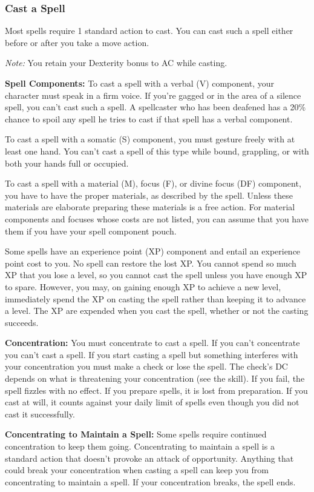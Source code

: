 \subsubsection{Cast a Spell}
Most spells require 1 standard action to cast. You can cast such a spell either before or after you take a move action.

\textit{Note:} You retain your Dexterity bonus to AC while casting.

\textbf{Spell Components:} To cast a spell with a verbal (V) component, your character must speak in a firm voice. If you're gagged or in the area of a silence spell, you can't cast such a spell. A spellcaster who has been deafened has a 20\% chance to spoil any spell he tries to cast if that spell has a verbal component.

To cast a spell with a somatic (S) component, you must gesture freely with at least one hand. You can't cast a spell of this type while bound, grappling, or with both your hands full or occupied.

To cast a spell with a material (M), focus (F), or divine focus (DF) component, you have to have the proper materials, as described by the spell. Unless these materials are elaborate preparing these materials is a free action. For material components and focuses whose costs are not listed, you can assume that you have them if you have your spell component pouch.

Some spells have an experience point (XP) component and entail an experience point cost to you. No spell can restore the lost XP. You cannot spend so much XP that you lose a level, so you cannot cast the spell unless you have enough XP to spare. However, you may, on gaining enough XP to achieve a new level, immediately spend the XP on casting the spell rather than keeping it to advance a level. The XP are expended when you cast the spell, whether or not the casting succeeds.

\textbf{Concentration:} You must concentrate to cast a spell. If you can't concentrate you can't cast a spell. If you start casting a spell but something interferes with your concentration you must make a  check or lose the spell. The check's DC depends on what is threatening your concentration (see the  skill). If you fail, the spell fizzles with no effect. If you prepare spells, it is lost from preparation. If you cast at will, it counts against your daily limit of spells even though you did not cast it successfully.

\textbf{Concentrating to Maintain a Spell:} Some spells require continued concentration to keep them going. Concentrating to maintain a spell is a standard action that doesn't provoke an attack of opportunity. Anything that could break your concentration when casting a spell can keep you from concentrating to maintain a spell. If your concentration breaks, the spell ends.

